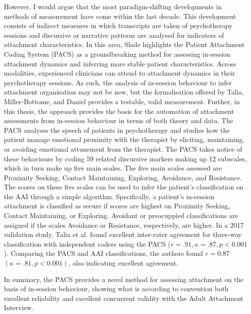 \documentclass[12pt]{report}
\begin{document}
However, I would argue that the most paradigm-shifting developments in methods of measurement have come within the last decade.
This development consists of indirect measures in which transcripts are taken of psychotherapy sessions and discursive or narrative patterns are analysed for indicators of attachment characteristics.
In this area, Slade \cite{Slade2016} highlights the Patient Attachment Coding System (PACS) as a groundbreaking method for assessing in-session attachment dynamics and inferring more stable patient characteristics.
Across modalities, experienced clinicians can attend to attachment dynamics in their psychotherapy sessions. As such, the analysis of in-session behaviour to infer attachment organisation may not be new, but the formalisation offered by Talia, Miller-Bottome, and Daniel \cite{Talia2017, Talia2014} provides a testable, valid measurement. Further, in this thesis, the approach provides the basis for the automation of attachment assessments from in-session behaviour in terms of both theory and data.
The PACS analyses the speech of patients in psychotherapy and studies how the patient manage emotional proximity with the therapist by eliciting, maintaining, or avoiding emotional attunement from the therapist.
The PACS takes notice of these behaviours by coding 59 related discursive markers making up 12 subscales, which in turn make up five main scales.
The five main scales assessed are Proximity Seeking, Contact Maintaining, Exploring, Avoidance, and Resistance.
The scores on these five scales can be used to infer the patient's classification on the AAI through a simple algorithm.
Specifically, a patient's in-session attachment is classified as secure if scores are highest on Proximity Seeking, Contact Maintaining, or Exploring. Avoidant or preocuppied classifications are assigned if the scales Avoidance or Resistance, respectively, are higher.
In a 2017 validation study, Talia et al. \cite{Talia2017} found excellent inter-rater agreement for three-way classification with independent coders using the PACS ($r=.91, \kappa = .87, p<0.001$). Comparing the PACS and AAI classifications, the authors found $r=0.87$ $(\kappa = .81, p<0.001)$, also indicating excellent agreement.

In summary, the PACS provides a novel method for assessing attachment on the basis of in-session behaviour, showing what is according to convention both excellent reliability and excellent concurrent validity with the Adult Attachment Interview.
\end{document}
